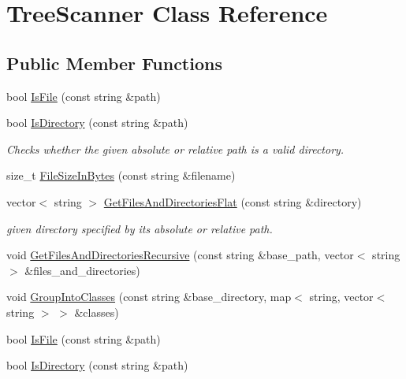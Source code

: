 \hypertarget{class_tree_scanner}{\section{Tree\-Scanner Class Reference}
\label{class_tree_scanner}
}
\subsection*{Public Member Functions}
\begin{DoxyCompactItemize}
\item 
bool \hyperlink{class_tree_scanner_ae00aada3fc132df9c016b929cf28c9bc}{Is\-File} (const string \&path)
\item 
\hypertarget{class_tree_scanner_aa7b2ea3b785abfeb7947fdd74ce64953}{bool \hyperlink{class_tree_scanner_aa7b2ea3b785abfeb7947fdd74ce64953}{Is\-Directory} (const string \&path)}\label{class_tree_scanner_aa7b2ea3b785abfeb7947fdd74ce64953}

\begin{DoxyCompactList}\small\item\em Checks whether the given absolute or relative path is a valid directory. \end{DoxyCompactList}\item 
size\-\_\-t \hyperlink{class_tree_scanner_af9f6d985cb42d2cd7505b1213edd04b8}{File\-Size\-In\-Bytes} (const string \&filename)
\item 
vector$<$ string $>$ \hyperlink{class_tree_scanner_a1ad8ab7b22690ae99f25e9b26ab31f6d}{Get\-Files\-And\-Directories\-Flat} (const string \&directory)
\begin{DoxyCompactList}\small\item\em given directory specified by its absolute or relative path. \end{DoxyCompactList}\item 
void \hyperlink{class_tree_scanner_a042ddf3be0d3960dbca0362fb52cd1cd}{Get\-Files\-And\-Directories\-Recursive} (const string \&base\-\_\-path, vector$<$ string $>$ \&files\-\_\-and\-\_\-directories)
\item 
void \hyperlink{class_tree_scanner_add67141b6bca7a3abc72ea305ac915bd}{Group\-Into\-Classes} (const string \&base\-\_\-directory, map$<$ string, vector$<$ string $>$ $>$ \&classes)
\item 
bool \hyperlink{class_tree_scanner_ae00aada3fc132df9c016b929cf28c9bc}{Is\-File} (const string \&path)
\item 
\hypertarget{class_tree_scanner_aa7b2ea3b785abfeb7947fdd74ce64953}{bool \hyperlink{class_tree_scanner_aa7b2ea3b785abfeb7947fdd74ce64953}{Is\-Directory} (const string \&path)}\label{class_tree_scanner_aa7b2ea3b785abfeb7947fdd74ce64953}


\end{DoxyCompactItemize}

